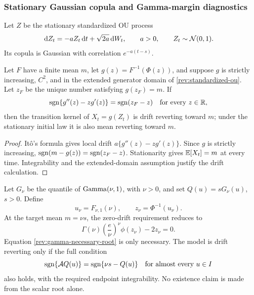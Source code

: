 \subsubsection{Stationary Gaussian copula and Gamma-margin diagnostics}

Let $Z$ be the stationary standardized OU process
\begin{equation}
\,\mathrm d Z_t=-aZ_t\,\mathrm d t+\sqrt{2a}\,\mathrm d W_t,\qquad a>0,\qquad Z_t\sim\mathcal N(0,1).
\label{rev:standardized-ou}
\end{equation}
Its copula is Gaussian with correlation $e^{-a(t-s)}$.

\begin{proposition}
\label{rev:prop-stationary-gaussian}
Let $F$ have a finite mean $m$, let
$g(z)=F^{-1}(\Phi(z))$, and suppose $g$ is strictly increasing,
$C^2$, and in the extended generator domain of \eqref{rev:standardized-ou}.
Let $z_F$ be the unique number satisfying $g(z_F)=m$.  If
\begin{equation}
\operatorname{sgn}\{g''(z)-zg'(z)\}=\operatorname{sgn}(z_F-z)
\quad\text{for every }z\in\mathbb R,
\label{rev:stationary-gaussian-sign}
\end{equation}
then the transition kernel of $X_t=g(Z_t)$ is drift reverting toward $m$;
under the stationary initial law it is also mean reverting toward $m$.
\end{proposition}

\begin{proof}
It\^o's formula gives local drift
$a\{g''(z)-zg'(z)\}$.  Since $g$ is strictly increasing,
$\operatorname{sgn}(m-g(z))=\operatorname{sgn}(z_F-z)$.  Stationarity gives
$\mathbb E[X_t]=m$ at every time.  Integrability and the extended-domain assumption
justify the drift calculation.
\end{proof}

\begin{example}
\label{rev:ex-gamma-stationary}
Let $G_\nu$ be the quantile of $\operatorname{Gamma}(\nu,1)$, with $\nu>0$, and set
$Q(u)=sG_\nu(u)$, $s>0$.  Define
\begin{equation}
u_\nu=F_{\nu,1}(\nu),\qquad z_\nu=\Phi^{-1}(u_\nu).
\label{rev:gamma-mean-quantile}
\end{equation}
At the target mean $m=\nu s$, the zero-drift requirement reduces to
\begin{equation}
\Gamma(\nu)\left(\frac e\nu\right)^\nu\phi(z_\nu)-2z_\nu=0.
\label{rev:gamma-necessary-root}
\end{equation}
Equation \eqref{rev:gamma-necessary-root} is only necessary.  The model is
drift reverting only if the full condition
\begin{equation}
\operatorname{sgn}\{\mathcal A Q(u)\}=\operatorname{sgn}\{\nu s-Q(u)\}
\quad\text{for almost every }u\in I
\label{rev:gamma-full-sign}
\end{equation}
also holds, with the required endpoint integrability.  No existence claim is
made from the scalar root alone.
\end{example}


